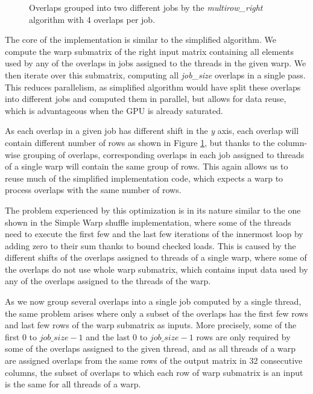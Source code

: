 \begin{figure}[ht]
	\centering
	\def\svgwidth{0.6\textwidth}
	\fontsize{6}{8}\selectfont
	
	\caption{Overlaps grouped into two different jobs by the \textit{multirow\_right} algorithm with 4 overlaps per job.}
	\label{fig:multirow_shifts}
\end{figure}

The core of the implementation is similar to the simplified algorithm. We compute the warp submatrix of the right input matrix containing all elements used by any of the overlaps in jobs assigned to the threads in the given warp. We then iterate over this submatrix, computing all \textit{job\_size} overlaps in a single pass. This reduces parallelism, as simplified algorithm would have split these overlaps into different jobs and computed them in parallel, but allows for data reuse, which is advantageous when the GPU is already saturated.

As each overlap in a given job has different shift in the \textit{y} axis, each overlap will contain different number of rows as shown in Figure \ref{fig:multirow_shifts}, but thanks to the column-wise grouping of overlaps, corresponding overlaps in each job assigned to threads of a single warp will contain the same group of rows. This again allows us to reuse much of the simplified implementation code, which expects a warp to process overlaps with the same number of rows.

The problem experienced by this optimization is in its nature similar to the one shown in the Simple Warp shuffle implementation, where some of the threads need to execute the first few and the last few iterations of the innermost loop by adding zero to their sum thanks to bound checked loads. This is caused by the different shifts of the overlaps assigned to threads of a single warp, where some of the overlaps do not use whole warp submatrix, which contains input data used by any of the overlaps assigned to the threads of the warp.

As we now group several overlaps into a single job computed by a single thread, the same problem arises where only a subset of the overlaps has the first few rows and last few rows of the warp submatrix as inputs. More precisely, some of the first $0$ to $job\_size - 1$ and the last $0$ to $job\_size - 1$ rows are only required by some of the overlaps assigned to the given thread, and as all threads of a warp are assigned overlaps from the same rows of the output matrix in 32 consecutive columns, the subset of overlaps to which each row of warp submatrix is an input is the same for all threads of a warp.

